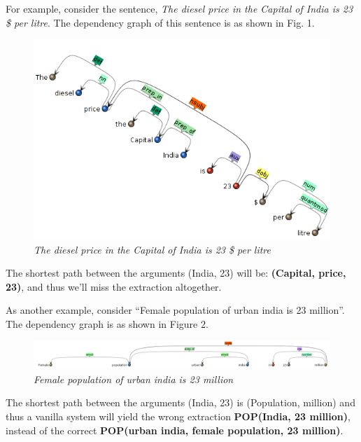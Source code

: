\documentclass[a4paper,10pt]{article}
\begin{document}
 For example, consider the sentence, \emph{The diesel price in the Capital of India is 23 \$ per litre}.
 The dependency graph of this sentence is as shown in Fig. 1.
\begin{center}
\begin{figure}[h]
 \includegraphics[scale=0.48]{diesel.png}
 \caption{\emph{The diesel price in the Capital of India is 23 \$ per litre}}
 \end{figure}
\end{center}
The shortest path between the arguments (India, 23) will be:
\textbf{(Capital, price, 23)}, and thus we'll miss the extraction altogether.

As another example, consider ``Female population of urban india is 23 million''. The dependency graph is as shown in Figure 2.

 \begin{center}
 \begin{figure}
  \includegraphics[scale=0.35]{urban_rural.png}
 \caption{\emph{Female population of urban india is 23 million}}
 \end{figure}
\end{center}

The shortest path between the arguments  (India, 23) is (Population, million) and thus a vanilla
system will yield the wrong extraction \textbf{\color{red} POP(India, 23 million)}, instead of the correct \textbf{\color{red} POP(urban india, female population, 23 million)}.
\end{document}
